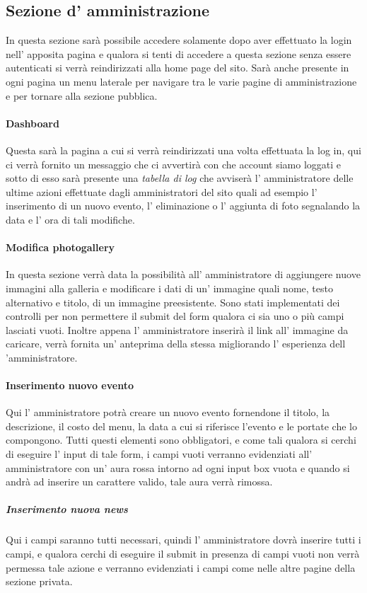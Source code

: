 \subsection{Sezione d' amministrazione}
In questa sezione sarà possibile accedere solamente dopo aver effettuato la login nell' apposita pagina e qualora si tenti di accedere a questa sezione senza essere autenticati si verrà reindirizzati alla home page del sito. Sarà anche presente in ogni pagina un menu laterale per navigare tra le varie pagine di amministrazione e per tornare alla sezione pubblica.
\paragraph{Dashboard}
Questa sarà la pagina a cui si verrà reindirizzati una volta effettuata la log in, qui ci verrà fornito un messaggio che ci avvertirà con che account siamo loggati e sotto di esso sarà presente una \emph{tabella di log} che avviserà l' amministratore delle ultime azioni effettuate dagli amministratori del sito quali ad esempio l' inserimento di un nuovo evento, l' eliminazione o l' aggiunta di foto segnalando la data e l' ora di tali modifiche.
\paragraph{Modifica photogallery}
In questa sezione verrà data la possibilità all' amministratore di aggiungere nuove immagini alla galleria e modificare i dati di un' immagine quali nome, testo alternativo e titolo, di un immagine preesistente. Sono stati implementati dei controlli per non permettere il submit del form qualora ci sia uno o più campi lasciati vuoti. Inoltre appena l' amministratore inserirà il link all' immagine da caricare, verrà fornita un' anteprima della stessa migliorando l' esperienza dell 'amministratore.
\paragraph{Inserimento nuovo evento}
Qui l' amministratore potrà creare un nuovo evento fornendone il titolo, la descrizione, il costo del menu, la data a cui si riferisce l'evento e le portate che lo compongono. Tutti questi elementi sono obbligatori, e come tali qualora si cerchi di eseguire l' input di tale form, i campi vuoti verranno evidenziati all' amministratore con un' aura rossa intorno ad ogni input box vuota e quando si andrà ad inserire un carattere valido, tale aura verrà rimossa.
\subparagraph{Inserimento nuova news}
Qui i campi saranno tutti necessari, quindi l' amministratore dovrà inserire tutti i campi, e qualora cerchi di eseguire il submit in presenza di campi vuoti non verrà permessa tale azione e verranno evidenziati i campi come nelle altre pagine della sezione privata.


